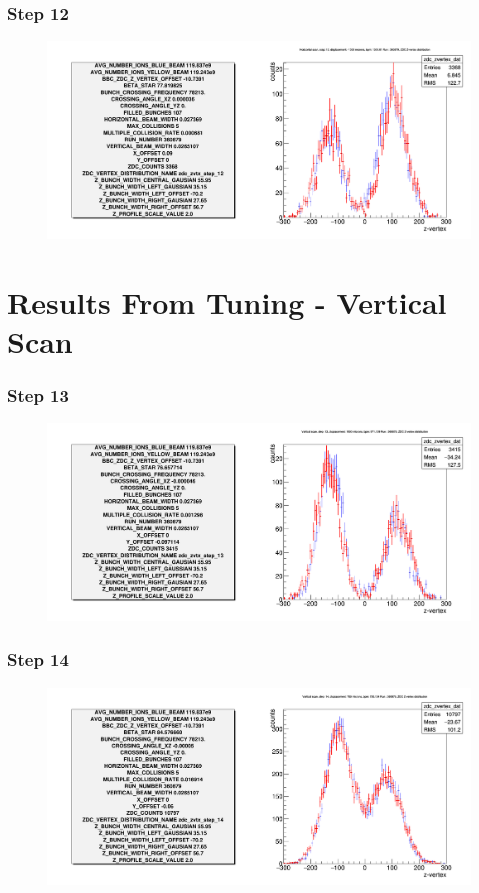 \begin{frame}
  \frametitle{Step 12}
  \begin{figure}
    \includegraphics[width=\linewidth]{"./figures/tuned_simulation_step_12"}
    \label{fig:step_12}
  \end{figure}
\end{frame}

\section{Results From Tuning - Vertical Scan}

\begin{frame}
  \frametitle{Step 13}
  \begin{figure}
    \includegraphics[width=\linewidth]{"./figures/tuned_simulation_step_13"}
    \label{fig:step_13}
  \end{figure}
\end{frame}

\begin{frame}
  \frametitle{Step 14}
  \begin{figure}
    \includegraphics[width=\linewidth]{"./figures/tuned_simulation_step_14"}
    \label{fig:step_14}
  \end{figure}
\end{frame}

